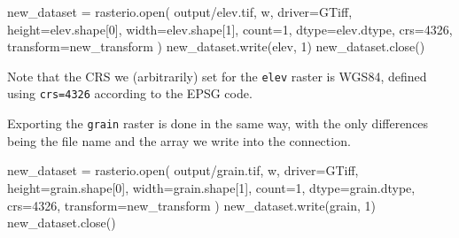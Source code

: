\documentclass[
  letterpaper,
]{krantz}
\newenvironment{Shaded}{\begin{snugshade}}{\end{snugshade}}
\newcommand{\BuiltInTok}[1]{\textcolor[rgb]{0.00,0.23,0.31}{#1}}
\newcommand{\DecValTok}[1]{\textcolor[rgb]{0.68,0.00,0.00}{#1}}
\newcommand{\NormalTok}[1]{\textcolor[rgb]{0.00,0.23,0.31}{#1}}
\newcommand{\OperatorTok}[1]{\textcolor[rgb]{0.37,0.37,0.37}{#1}}
\newcommand{\StringTok}[1]{\textcolor[rgb]{0.13,0.47,0.30}{#1}}
\begin{document}
\begin{Shaded}
\begin{Highlighting}[]
\NormalTok{new\_dataset }\OperatorTok{=}\NormalTok{ rasterio.}\BuiltInTok{open}\NormalTok{(}
    \StringTok{\textquotesingle{}output/elev.tif\textquotesingle{}}\NormalTok{, }\StringTok{\textquotesingle{}w\textquotesingle{}}\NormalTok{, }
\NormalTok{    driver}\OperatorTok{=}\StringTok{\textquotesingle{}GTiff\textquotesingle{}}\NormalTok{,}
\NormalTok{    height}\OperatorTok{=}\NormalTok{elev.shape[}\DecValTok{0}\NormalTok{],}
\NormalTok{    width}\OperatorTok{=}\NormalTok{elev.shape[}\DecValTok{1}\NormalTok{],}
\NormalTok{    count}\OperatorTok{=}\DecValTok{1}\NormalTok{,}
\NormalTok{    dtype}\OperatorTok{=}\NormalTok{elev.dtype,}
\NormalTok{    crs}\OperatorTok{=}\DecValTok{4326}\NormalTok{,}
\NormalTok{    transform}\OperatorTok{=}\NormalTok{new\_transform}
\NormalTok{)}
\NormalTok{new\_dataset.write(elev, }\DecValTok{1}\NormalTok{)}
\NormalTok{new\_dataset.close()}
\end{Highlighting}
\end{Shaded}

Note that the CRS we (arbitrarily) set for the \texttt{elev} raster is
WGS84, defined using \texttt{crs=4326} according to the EPSG code.

Exporting the \texttt{grain} raster is done in the same way, with the
only differences being the file name and the array we write into the
connection.

\begin{Shaded}
\begin{Highlighting}[]
\NormalTok{new\_dataset }\OperatorTok{=}\NormalTok{ rasterio.}\BuiltInTok{open}\NormalTok{(}
    \StringTok{\textquotesingle{}output/grain.tif\textquotesingle{}}\NormalTok{, }\StringTok{\textquotesingle{}w\textquotesingle{}}\NormalTok{, }
\NormalTok{    driver}\OperatorTok{=}\StringTok{\textquotesingle{}GTiff\textquotesingle{}}\NormalTok{,}
\NormalTok{    height}\OperatorTok{=}\NormalTok{grain.shape[}\DecValTok{0}\NormalTok{],}
\NormalTok{    width}\OperatorTok{=}\NormalTok{grain.shape[}\DecValTok{1}\NormalTok{],}
\NormalTok{    count}\OperatorTok{=}\DecValTok{1}\NormalTok{,}
\NormalTok{    dtype}\OperatorTok{=}\NormalTok{grain.dtype,}
\NormalTok{    crs}\OperatorTok{=}\DecValTok{4326}\NormalTok{,}
\NormalTok{    transform}\OperatorTok{=}\NormalTok{new\_transform}
\NormalTok{)}
\NormalTok{new\_dataset.write(grain, }\DecValTok{1}\NormalTok{)}
\NormalTok{new\_dataset.close()}
\end{Highlighting}
\end{Shaded}
\end{document}
